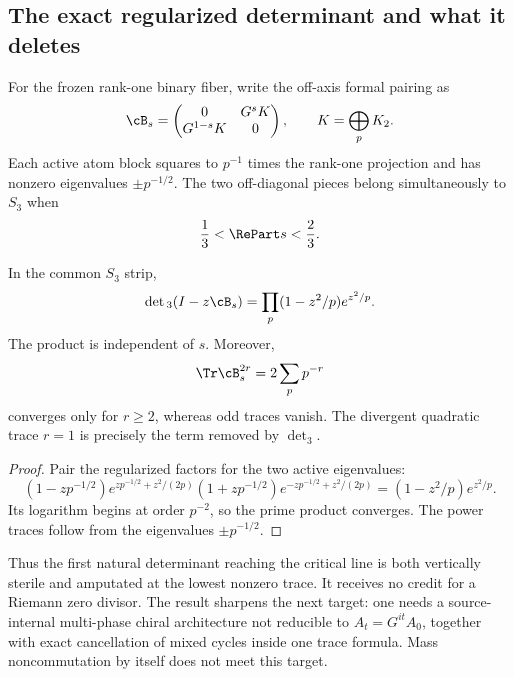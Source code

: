 \subsection{The exact regularized determinant and what it deletes}

For the frozen rank-one binary fiber, write the off-axis formal pairing as
\[
 \cB_s=
 \begin{pmatrix}
 0&G^sK\\G^{1-s}K&0
 \end{pmatrix},
 \qquad K=\bigoplus_pK_2.
\]
Each active atom block squares to $p^{-1}$ times the rank-one projection and
has nonzero eigenvalues $\pm p^{-1/2}$. The two off-diagonal pieces belong
simultaneously to $S_3$ when
\[
 \frac13<\RePart s<\frac23.
\]

\begin{proposition}
\label{prop:det3}
In the common $S_3$ strip,
\[
 \det{}_3(I-z\cB_s)
 =\prod_p(1-z^2/p)e^{z^2/p}.
\]
The product is independent of $s$. Moreover,
\[
 \Tr\cB_s^{2r}=2\sum_pp^{-r}
\]
converges only for $r\ge2$, whereas odd traces vanish. The divergent
quadratic trace $r=1$ is precisely the term removed by $\det_3$.
\end{proposition}

\begin{proof}
Pair the regularized factors for the two active eigenvalues:
\[
 (1-zp^{-1/2})e^{zp^{-1/2}+z^2/(2p)}
 (1+zp^{-1/2})e^{-zp^{-1/2}+z^2/(2p)}
 =(1-z^2/p)e^{z^2/p}.
\]
Its logarithm begins at order $p^{-2}$, so the prime product converges. The
power traces follow from the eigenvalues $\pm p^{-1/2}$.
\end{proof}

Thus the first natural determinant reaching the critical line is both
vertically sterile and amputated at the lowest nonzero trace. It receives no
credit for a Riemann zero divisor. The result sharpens the next target: one
needs a source-internal multi-phase chiral architecture not reducible to
$A_t=G^{it}A_0$, together with exact cancellation of mixed cycles inside one
trace formula. Mass noncommutation by itself does not meet this target.
